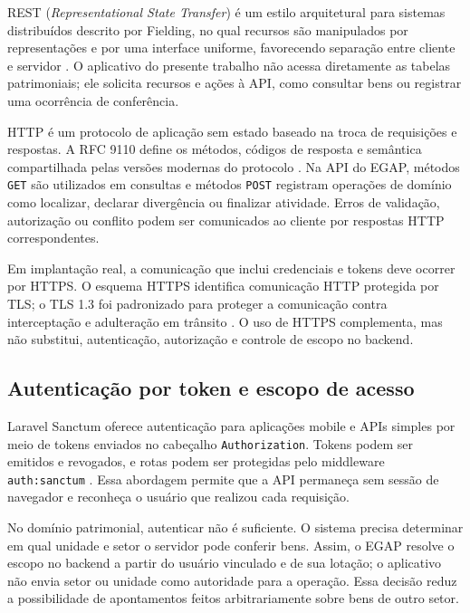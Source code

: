 \documentclass[12pt,a4paper]{article}
\begin{document}
REST (\textit{Representational State Transfer}) é um estilo arquitetural para
sistemas distribuídos descrito por Fielding, no qual recursos são manipulados
por representações e por uma interface uniforme, favorecendo separação entre
cliente e servidor \cite{fielding2000}. O aplicativo do presente trabalho não
acessa diretamente as tabelas patrimoniais; ele solicita recursos e ações à
API, como consultar bens ou registrar uma ocorrência de conferência.

HTTP é um protocolo de aplicação sem estado baseado na troca de requisições e
respostas. A RFC 9110 define os métodos, códigos de resposta e semântica
compartilhada pelas versões modernas do protocolo \cite{rfc9110}. Na API do
EGAP, métodos \texttt{GET} são utilizados em consultas e métodos
\texttt{POST} registram operações de domínio como localizar, declarar
divergência ou finalizar atividade. Erros de validação, autorização ou conflito
podem ser comunicados ao cliente por respostas HTTP correspondentes.

Em implantação real, a comunicação que inclui credenciais e tokens deve ocorrer
por HTTPS. O esquema HTTPS identifica comunicação HTTP protegida por TLS; o TLS
1.3 foi padronizado para proteger a comunicação contra interceptação e
adulteração em trânsito \cite{rfc9110,rfc8446}. O uso de HTTPS complementa,
mas não substitui, autenticação, autorização e controle de escopo no backend.

\subsection{Autenticação por token e escopo de acesso}

Laravel Sanctum oferece autenticação para aplicações mobile e APIs simples por
meio de tokens enviados no cabeçalho \texttt{Authorization}. Tokens podem ser
emitidos e revogados, e rotas podem ser protegidas pelo middleware
\texttt{auth:sanctum} \cite{laravelsanctum}. Essa abordagem permite que a API
permaneça sem sessão de navegador e reconheça o usuário que realizou cada
requisição.

No domínio patrimonial, autenticar não é suficiente. O sistema precisa
determinar em qual unidade e setor o servidor pode conferir bens. Assim, o
EGAP resolve o escopo no backend a partir do usuário vinculado e de sua
lotação; o aplicativo não envia setor ou unidade como autoridade para a
operação. Essa decisão reduz a possibilidade de apontamentos feitos
arbitrariamente sobre bens de outro setor.
\end{document}
